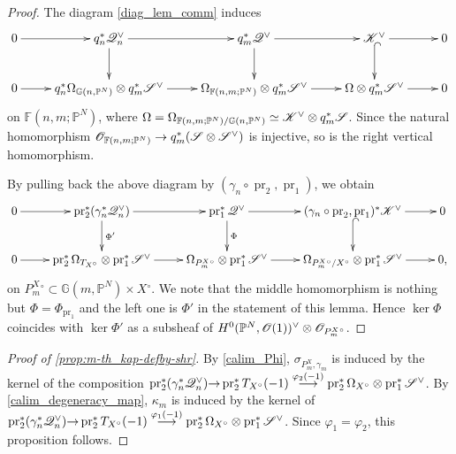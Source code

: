 \documentclass[a4paper,12pt]{amsart}
\theoremstyle{plain}
\theoremstyle{definition}
\begin{document}
\begin{proof}
  The diagram \autoref{diag_lem_comm} induces
  \[
  \xymatrix{
    0 \ar[r] & q_n^* {\mathscr{Q}}_{n}\spcheck \ar[r] \ar[d] &  q_m^* {\mathscr{Q}}\spcheck   \ar[r] \ar[d]
    &  \mathscr{K}\spcheck  \ar@{^(->}[d] \ar[r]&0
    \\
    0 \ar[r] & q_n^* \Omega_{{\mathbb {G}}(n,{\mathbb{P}}^N)} \otimes   q_m^* {\mathscr{S}}\spcheck  \ar[r] & \Omega_{\mathbb{F}(n,m ;{\mathbb{P}}^N)} \otimes   q_m^* {\mathscr{S}}\spcheck    \ar[r]
    &  \Omega \otimes   q_m^* {\mathscr{S}}\spcheck \ar[r] &0
  } 
  \]
  on $\mathbb{F}(n,m ;{\mathbb{P}}^N)$, 
  where   $\Omega = \Omega_{\mathbb{F}(n,m ;{\mathbb{P}}^N)/ {\mathbb {G}}(n,{\mathbb{P}}^N)} \simeq \mathscr{K}\spcheck \otimes  q_m^* {\mathscr{S}}$.
  Since the natural homomorphism ${\mathscr{O}}_{\mathbb{F}(n,m ;{\mathbb{P}}^N)} \rightarrow  q_m^* ({\mathscr{S}} \otimes {\mathscr{S}}\spcheck)$ is injective,
  so is the right vertical homomorphism.

  By pulling back the above diagram by $(\gamma_n \circ \operatorname{pr}_2 , \operatorname{pr}_1)  $,
  we obtain
  \[
  \xymatrix{   0 \ar[r] & \operatorname{pr}_2^*(\gamma_n^*{\mathscr{Q}}_{n}\spcheck) \ar[r] \ar[d]^{\Phi'} &  \operatorname{pr}_1^* {\mathscr{Q}}\spcheck   \ar[r] \ar[d]^{\Phi}
    &  (\gamma_n \circ \operatorname{pr}_2 , \operatorname{pr}_1)^* \mathscr{K}\spcheck  \ar@{^(->}[d] \ar[r]&0
    \\
    0 \ar[r] & \operatorname{pr}_2^* \Omega_{T_{X{^\circ}}} \otimes   \operatorname{pr}_1^* {\mathscr{S}}\spcheck  \ar[r] & \Omega_{{P_m^{X}}{^\circ}} \otimes   \operatorname{pr}_1^* {\mathscr{S}}\spcheck    \ar[r]
    &  \Omega_{{{P_m^{X}}{^\circ}}/ {X{^\circ}}} \otimes   \operatorname{pr}_1^* {\mathscr{S}}\spcheck \ar[r] &0,
  } 
  \]
  on ${{P_m^{X}}{^\circ}} \subset {{\mathbb{G}}(m,{{\mathbb{P}}^N})} \times {X{^\circ}}$.
  We note that the middle homomorphism is nothing but $\Phi = \Phi_{\operatorname{pr}_1}$
  and the left one is $\Phi'$ in the statement of this lemma.
  Hence $\ker \Phi $ coincides with $\ker \Phi'$ as a subsheaf of $ H^0({{\mathbb{P}}^N}, {\mathscr{O}}(1))\spcheck \otimes {\mathscr{O}}_{{P_m^{X}}{^\circ}}$.
\end{proof}

\begin{proof}[Proof of \autoref{prop:m-th_kap-defby-shr}]
  By \autoref{calim_Phi},
  $\sigma_{P_m^X, \gamma_m}$ is induced by the kernel of the composition
  $\operatorname{pr}_2^*(\gamma_n^*{\mathscr{Q}}_{n}\spcheck) {\rightarrow} \operatorname{pr}_2^* T_{X{^\circ}}(-1) \stackrel{\varphi_2(-1)}{\longrightarrow}  \operatorname{pr}_2^* \Omega_{X{^\circ}} \otimes  \operatorname{pr}_1^*{\mathscr{S}}\spcheck$.
  By \autoref{calim_degeneracy_map},
  $\kappa_m$ is induced by the kernel of
  $\operatorname{pr}_2^*(\gamma_n^*{\mathscr{Q}}_{n}\spcheck) {\rightarrow} \operatorname{pr}_2^* T_{X{^\circ}}(-1) \stackrel{\varphi_1(-1)}{\longrightarrow}  \operatorname{pr}_2^* \Omega_{X{^\circ}} \otimes  \operatorname{pr}_1^*{\mathscr{S}}\spcheck$.
  Since $\varphi_1=\varphi_2$,
  this proposition follows.
\end{proof}
\end{document}
